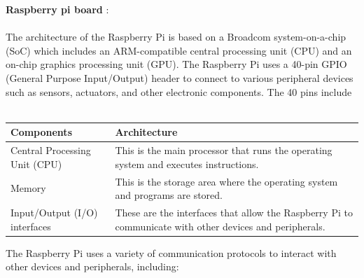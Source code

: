 \documentclass{report}
\begin{document}
\begin{multicols}{1}
{        \textbf{Raspberry pi board} : \\ \\
        The architecture of the Raspberry Pi is based on a Broadcom system-on-a-chip (SoC) which includes an ARM-compatible central processing unit (CPU) and an on-chip graphics processing unit (GPU).
        The Raspberry Pi uses a 40-pin GPIO (General Purpose Input/Output) header to connect to various peripheral devices such as sensors, actuators, and other electronic components. The 40 pins include \\ \\   
        \begin{tabular}{ | m{6em} | m{5cm} | } 
            \hline
            \textbf Components  & Architecture\\ 
            \hline
            Central Processing Unit (CPU) & This is the main processor that runs the operating system and executes instructions. \\ 
            \hline
            Memory & This is the storage area where the operating system and programs are stored.\\ 
            \hline
           Input/Output (I/O) interfaces & These are the interfaces that allow the Raspberry Pi to communicate with other devices and peripherals.\\
            \hline
        \end{tabular}


        The Raspberry Pi uses a variety of communication protocols to interact with other devices and peripherals, including: \\

}
\end{multicols}
\end{document}
